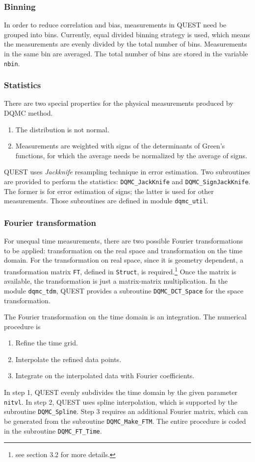 \documentclass[12pt]{article}
\begin{document}
\subsubsection{Binning}
In order to reduce correlation and bias, measurements in QUEST need be grouped into bins. Currently, equal divided binning strategy is used, which means the measurements are evenly divided by the total number of bins. Measurements in the same bin are averaged. The total number of bins are stored in the variable \verb"nbin".

\subsubsection{Statistics}
There are two special properties for the physical measurements produced by DQMC method.
\begin{enumerate}
  \item The distribution is not normal.
  \item Measurements are weighted with signs of the determinants of Green's functions, for which the average needs be normalized by the average of signs.
\end{enumerate}

QUEST uses \emph{Jackknife} resampling technique in error estimation. Two subroutines are provided to perform the statistics: \verb"DQMC_JackKnife" and \verb"DQMC_SignJackKnife".
The former is for error estimation of signs; the latter is used for other measurements. Those subroutines are defined in module \verb"dqmc_util".

\subsubsection{Fourier transformation}
For unequal time measurements, there are two possible Fourier transformations to be applied: transformation on the real space and transformation on the time domain. For the transformation on real space, since it is geometry dependent, a transformation matrix \verb"FT", defined in \verb"Struct", is required.\footnote{see section 3.2 for more details.} Once the matrix is available, the transformation is just a matrix-matrix multiplication. In the module \verb"dqmc_tdm", QUEST provides a subroutine \verb"DQMC_DCT_Space" for the space transformation.

The Fourier transformation on the time domain is an integration. The numerical procedure is
\begin{enumerate}
  \item Refine the time grid.
  \item Interpolate the refined data points.
  \item Integrate on the interpolated data with Fourier coefficients.
\end{enumerate}
In step 1, QUEST evenly subdivides the time domain by the given parameter \verb"nitvl".
In step 2, QUEST uses spline interpolation, which is supported by the subroutine \verb"DQMC_Spline". Step 3 requires an additional Fourier matrix, which can be generated from the subroutine \verb"DQMC_Make_FTM".  The entire procedure is coded in the subroutine \verb"DQMC_FT_Time".
\end{document}
